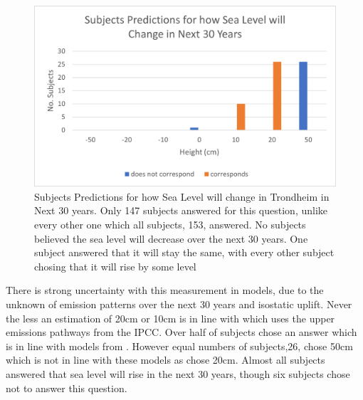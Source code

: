 \paragraph{}

\begin{figure}[h!]
    \centering
    \includegraphics{fig_results/slr-future.png}
    \caption{Subjects Predictions for how Sea Level will change in Trondheim in Next 30 years. Only 147 subjects answered for this question, unlike every other one which all subjects, 153, answered. No subjects believed the sea level will decrease over the next 30 years. One subject answered that it will stay the same, with every other subject chosing that it will rise by some level }
    \label{fig:my_label}
\end{figure}

There is strong uncertainty with this measurement in models, due to the unknown of emission patterns over the next 30 years and isostatic uplift. Never the less an estimation of 20cm or 10cm is in line with \cite{kartverket_se_2021} which uses the upper emissions pathways from the IPCC. Over half of subjects chose an answer which is in line with models from \cite{kartverket_se_2021}. However equal numbers of subjects,26, chose 50cm which is not in line with these models as chose 20cm. Almost all subjects answered that sea level will rise in the next 30 years, though six subjects chose not to answer this question.  

